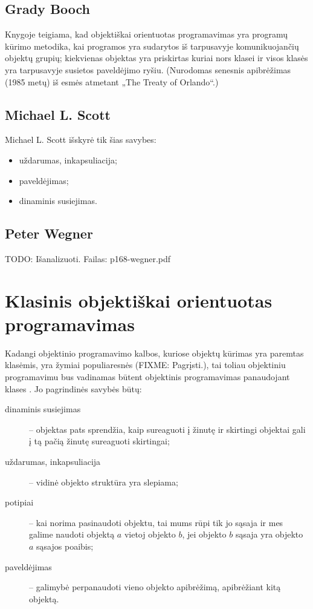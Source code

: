 \subsection{Grady Booch}

Knygoje \cite[41-42]{Booch:2007:OAD:1407387} teigiama, kad objektiškai
orientuotas programavimas yra programų kūrimo metodika, kai programos
yra sudarytos iš tarpusavyje komunikuojančių objektų grupių; kiekvienas
objektas yra priskirtas kuriai nors klasei ir visos klasės yra
tarpusavyje susietos paveldėjimo ryšiu. (Nurodomas senesnis
apibrėžimas (1985 metų) iš esmės atmetant „The Treaty of
Orlando“.)

\subsection{Michael L. Scott}

Michael L. Scott \cite[529-530]{programming-language-pragmatics}
išskyrė tik šias savybes:
\begin{itemize}
  \item uždarumas, inkapsuliacija;
  \item paveldėjimas;
  \item dinaminis susiejimas.
\end{itemize}

\subsection{Peter Wegner}

TODO: Išanalizuoti.\cite{Wegner:1987:DOL:38807.38823}
Failas: p168-wegner.pdf

\section{Klasinis objektiškai orientuotas programavimas}

Kadangi objektinio programavimo kalbos, kuriose objektų kūrimas yra
paremtas klasėmis, yra žymiai populiaresnės (FIXME: Pagrįsti.), tai
toliau objektiniu programavimu bus vadinamas būtent objektinis
programavimas panaudojant klases . Jo
pagrindinės savybės būtų:
\begin{description}
  \item[dinaminis susiejimas] – objektas pats sprendžia, kaip sureaguoti
    į žinutę ir skirtingi objektai gali į tą pačią žinutę sureaguoti
    skirtingai;
  \item[uždarumas, inkapsuliacija] – vidinė objekto struktūra yra
    slepiama;
  \item[potipiai] – kai norima pasinaudoti objektu, tai mums rūpi tik
    jo sąsaja ir mes galime naudoti objektą $a$ vietoj objekto $b$,
    jei objekto $b$ sąsaja yra objekto $a$ sąsajos poaibis;
  \item[paveldėjimas] – galimybė perpanaudoti vieno objekto apibrėžimą,
    apibrėžiant kitą objektą.
\end{description}

